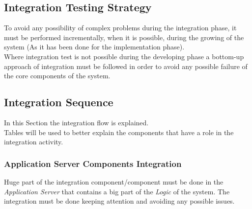 \subsection{Integration Testing Strategy}
To avoid any possibility of complex problems during the integration phase, it must be performed incrementally, when it is possible, during the growing of the system (As it has been done for the implementation phase).\\
Where integration test is not possible during the developing phase a bottom-up approach of integration must be followed in order to avoid any possible failure of the core components of the system.

\subsection{Integration Sequence}
In this Section the integration flow is explained.\\
Tables will be used to better explain the components that have a role in the integration activity.

\subsubsection{Application Server Components Integration}\label{appServCompIntRef}
Huge part of the integration component/component must be done in the \textit{Application Server} that contains a big part of the \textit{Logic} of the system. The integration must be done keeping attention and avoiding any possible issues.

